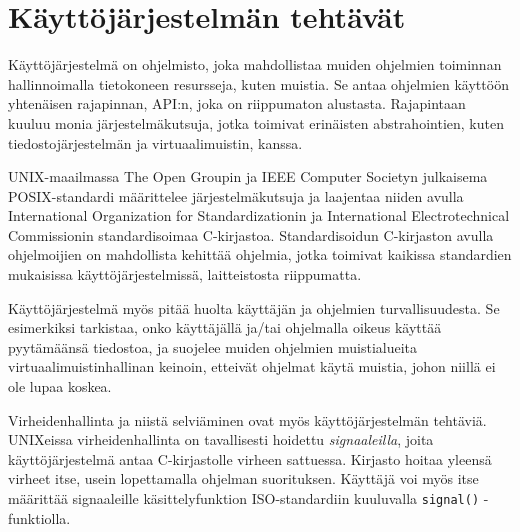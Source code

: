 \section{Käyttöjärjestelmän tehtävät}
Käyttöjärjestelmä on ohjelmisto, joka mahdollistaa muiden ohjelmien toiminnan hallinnoimalla tietokoneen resursseja, kuten muistia. Se antaa ohjelmien käyttöön yhtenäisen rajapinnan, API:n, joka on riippumaton alustasta. Rajapintaan kuuluu monia järjestelmäkutsuja, jotka toimivat erinäisten abstrahointien, kuten tiedostojärjestelmän ja virtuaalimuistin, kanssa.

\par

UNIX-maailmassa The Open Groupin ja IEEE Computer Societyn julkaisema POSIX-standardi määrittelee järjestelmäkutsuja ja laajentaa niiden avulla International Organization for Standardizationin ja International Electrotechnical Commissionin standardisoimaa C-kirjastoa. Standardisoidun C-kirjaston avulla ohjelmoijien on mahdollista kehittää ohjelmia, jotka toimivat kaikissa standardien mukaisissa käyttöjärjestelmissä, laitteistosta riippumatta.

\par

Käyttöjärjestelmä myös pitää huolta käyttäjän ja ohjelmien turvallisuudesta. Se esimerkiksi tarkistaa, onko käyttäjällä ja/tai ohjelmalla oikeus käyttää pyytämäänsä tiedostoa, ja suojelee muiden ohjelmien muistialueita virtuaalimuistinhallinan keinoin, etteivät ohjelmat käytä muistia, johon niillä ei ole lupaa koskea.

\par

Virheidenhallinta ja niistä selviäminen ovat myös käyttöjärjestelmän tehtäviä. UNIXeissa virheidenhallinta on tavallisesti hoidettu \textit{signaaleilla}, joita käyttöjärjestelmä antaa C-kirjastolle virheen sattuessa. Kirjasto hoitaa yleensä virheet itse, usein lopettamalla ohjelman suorituksen. Käyttäjä voi myös itse määrittää signaaleille käsittelyfunktion ISO-standardiin kuuluvalla \texttt{signal()} -funktiolla.